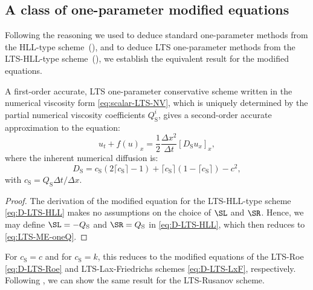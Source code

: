 \subsection{A class of one-parameter modified equations}

Following the reasoning we used to deduce standard one-parameter methods from the HLL-type scheme~(), and to deduce LTS one-parameter methods from the LTS-HLL-type scheme~(), we establish the equivalent result for the modified equations.

\begin{proposition}
A first-order accurate, LTS one-parameter conservative scheme written in the numerical viscosity form \eqref{eq:scalar-LTS-NV}, which is uniquely determined by the partial numerical viscosity coefficients $ Q_\text{S}^i $, gives a second-order accurate approximation to the equation:
\begin{equation} 
u_t + f(u)_x = \frac{1}{2} \frac{\Delta x^2}{\Delta t} \left[ D_\text{S} u_x \right]_x,
\end{equation}
where the inherent numerical diffusion is:
\begin{equation} \label{eq:LTS-ME-oneQ}
D_\text{S} = c_\text{S} \left( 2 \lceil c_\text{S} \rceil - 1 \right) + \lceil c_\text{S} \rceil \left( 1 - \lceil c_\text{S} \rceil \right) - c^2,
\end{equation}
with $ c_\text{S} = Q_\text{S} \Delta t / \Delta x $.
\end{proposition}

\begin{proof}
The derivation of the modified equation for the LTS-HLL-type scheme \eqref{eq:D-LTS-HLL} makes no assumptions on the choice of $ \SL $ and $ \SR $. Hence, we may define $ \SL=-Q_\text{S} $ and $ \SR=Q_\text{S} $ in \eqref{eq:D-LTS-HLL}, which then reduces to \eqref{eq:LTS-ME-oneQ}.
\end{proof}

For $ c_\text{S} = c $ and for $ c_\text{S} = k $, this reduces to the modified equations of the LTS-Roe \eqref{eq:D-LTS-Roe} and LTS-Lax-Friedrichs schemes \eqref{eq:D-LTS-LxF}, respectively.
Following , we can show the same result for the LTS-Rusanov scheme.

